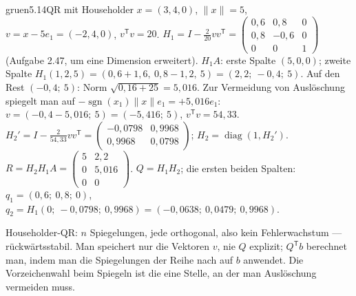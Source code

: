 \begin{loesungkarte}{gruen}{5.14}{QR mit Householder}
$x = (3, 4, 0)$, $\|x\| = 5$, $v = x - 5e_1 = (-2, 4, 0)$, $v^{\mathsf T}v = 20$. $H_1 = I - \frac2{20}vv^{\mathsf T} = \begin{pmatrix}0{,}6 & 0{,}8 & 0\\ 0{,}8 & -0{,}6 & 0\\ 0 & 0 & 1\end{pmatrix}$ (Aufgabe 2.47, um eine Dimension erweitert).
$H_1A$: erste Spalte $(5, 0, 0)$; zweite Spalte $H_1(1, 2, 5) = (0{,}6 + 1{,}6,\ 0{,}8 - 1{,}2,\ 5) = (2{,}2;\ -0{,}4;\ 5)$.
Auf den Rest $(-0{,}4;\ 5)$: Norm $\sqrt{0{,}16 + 25} = 5{,}016$. Zur Vermeidung von Auslöschung spiegelt man auf $-\operatorname{sgn}(x_1)\|x\|e_1 = +5{,}016e_1$: $v = (-0{,}4 - 5{,}016;\ 5) = (-5{,}416;\ 5)$, $v^{\mathsf T}v = 54{,}33$. $H_2' = I - \frac2{54{,}33}vv^{\mathsf T} = \begin{pmatrix}-0{,}0798 & 0{,}9968\\ 0{,}9968 & 0{,}0798\end{pmatrix}$; $H_2 = \operatorname{diag}(1, H_2')$.
$R = H_2H_1A = \begin{pmatrix}5 & 2{,}2\\ 0 & 5{,}016\\ 0 & 0\end{pmatrix}$. $Q = H_1H_2$; die ersten beiden Spalten: $q_1 = (0{,}6;\ 0{,}8;\ 0)$, $q_2 = H_1(0;\ -0{,}0798;\ 0{,}9968) = (-0{,}0638;\ 0{,}0479;\ 0{,}9968)$.
\begin{mitnehmen}\kastentext
Householder-QR: $n$ Spiegelungen, jede orthogonal, also kein Fehlerwachstum --- rückwärtsstabil. Man speichert nur die Vektoren $v$, nie $Q$ explizit; $Q^{\mathsf T}b$ berechnet man, indem man die Spiegelungen der Reihe nach auf $b$ anwendet. Die Vorzeichenwahl beim Spiegeln ist die eine Stelle, an der man Auslöschung vermeiden muss.
\end{mitnehmen}
\end{loesungkarte}

